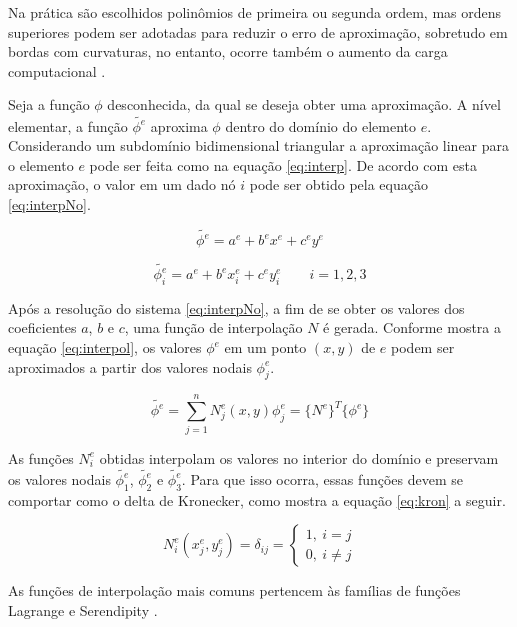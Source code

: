 \documentclass[
    12pt,               %
    openright,          %
    oneside,
    a4paper,            %
    english,            %
    french,             %
    spanish,            %
    brazil              %
    ]{abntex2}
\begin{document}
Na prática são escolhidos polinômios de primeira ou segunda ordem, mas ordens superiores podem ser adotadas para reduzir o erro de aproximação, sobretudo em bordas com curvaturas, no entanto, ocorre também o aumento da carga computacional \cite{jin}.

Seja a função $\phi$ desconhecida, da qual se deseja obter uma aproximação. A nível elementar, a função $\tilde{\phi^e}$ aproxima $\phi$ dentro do domínio do elemento $e$. Considerando um subdomínio bidimensional triangular a aproximação linear para o elemento $e$ pode ser feita como na equação \ref{eq:interp}. De acordo com esta aproximação, o valor em um dado nó $i$ pode ser obtido pela equação \ref{eq:interpNo}.

\begin{equation}
\label{eq:interp}
\tilde{\phi^e} = a^e + b^e x^e + c^e y^e
\end{equation}

\begin{equation}
\label{eq:interpNo}
\tilde{\phi^e_i} = a^e + b^e x^e_i + c^e y^e_i \qquad i = 1,2,3
\end{equation}

Após a resolução do sistema \ref{eq:interpNo}, a fim de se obter os valores dos coeficientes $a$, $b$ e $c$, uma função de interpolação $N$ é gerada. Conforme mostra a equação \ref{eq:interpol}, os valores $\phi^e$ em um ponto $(x,y)$ de $e$ podem ser aproximados  a partir dos valores nodais $\phi^e_j$.

\begin{equation}
\label{eq:interpol}
\tilde{\phi^e} = \sum_{j=1}^{n}{N_j^e (x, y) \phi_j^e} = 
\{N^e\}^T \{\phi^e\}
\end{equation}

As funções $N_i^e$ obtidas interpolam os valores no interior do domínio e preservam os valores nodais $\tilde{\phi^e_1}$, $\tilde{\phi^e_2}$ e $\tilde{\phi^e_3}$. Para que isso ocorra, essas funções devem se comportar como o delta de Kronecker, como mostra a equação \ref{eq:kron} a seguir.

\begin{equation}
\label{eq:kron}
N_i^e(x^e_j, y^e_j) = \delta_{ij} = \begin{cases}
1, \ i = j\\
0, \ i \neq j
\end{cases}
\end{equation}

As funções de interpolação mais comuns pertencem às famílias de funções Lagrange e Serendipity \cite{zien, volakis}.
\end{document}
